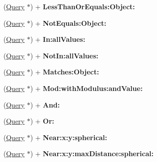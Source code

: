 \begin{DoxyCompactItemize}
\item 
\hypertarget{interface_query_a3b42654d1e9ec31ca385cd9840d2f335}{(\hyperlink{interface_query}{Query} $\ast$) + {\bfseries Less\-Than\-Or\-Equals\-:\-Object\-:}}\label{interface_query_a3b42654d1e9ec31ca385cd9840d2f335}

\item 
\hypertarget{interface_query_a2f0fb5d1245bcb6677d1fe017ffd6471}{(\hyperlink{interface_query}{Query} $\ast$) + {\bfseries Not\-Equals\-:\-Object\-:}}\label{interface_query_a2f0fb5d1245bcb6677d1fe017ffd6471}

\item 
\hypertarget{interface_query_aaa6c87c36653c3521306b04d40a0942c}{(\hyperlink{interface_query}{Query} $\ast$) + {\bfseries In\-:all\-Values\-:}}\label{interface_query_aaa6c87c36653c3521306b04d40a0942c}

\item 
\hypertarget{interface_query_a6c44dc446fdb5333943472283d2957ff}{(\hyperlink{interface_query}{Query} $\ast$) + {\bfseries Not\-In\-:all\-Values\-:}}\label{interface_query_a6c44dc446fdb5333943472283d2957ff}

\item 
\hypertarget{interface_query_a184cf6962bb862a232432735979bded2}{(\hyperlink{interface_query}{Query} $\ast$) + {\bfseries Matches\-:\-Object\-:}}\label{interface_query_a184cf6962bb862a232432735979bded2}

\item 
\hypertarget{interface_query_a23b0eb7702f2d1739390821e7edf8fa4}{(\hyperlink{interface_query}{Query} $\ast$) + {\bfseries Mod\-:with\-Modulus\-:and\-Value\-:}}\label{interface_query_a23b0eb7702f2d1739390821e7edf8fa4}

\item 
\hypertarget{interface_query_a396b6b462f5541a111bd3a75b30f92a5}{(\hyperlink{interface_query}{Query} $\ast$) + {\bfseries And\-:}}\label{interface_query_a396b6b462f5541a111bd3a75b30f92a5}

\item 
\hypertarget{interface_query_a7aa500c75488288a1713551a415d02ac}{(\hyperlink{interface_query}{Query} $\ast$) + {\bfseries Or\-:}}\label{interface_query_a7aa500c75488288a1713551a415d02ac}

\item 
\hypertarget{interface_query_a2bdbf5f4cf56fe550e63ccaedee32bae}{(\hyperlink{interface_query}{Query} $\ast$) + {\bfseries Near\-:x\-:y\-:spherical\-:}}\label{interface_query_a2bdbf5f4cf56fe550e63ccaedee32bae}

\item 
\hypertarget{interface_query_aa7af4893c033b2b638f214d059065ac3}{(\hyperlink{interface_query}{Query} $\ast$) + {\bfseries Near\-:x\-:y\-:max\-Distance\-:spherical\-:}}\label{interface_query_aa7af4893c033b2b638f214d059065ac3}

\end{DoxyCompactItemize}
